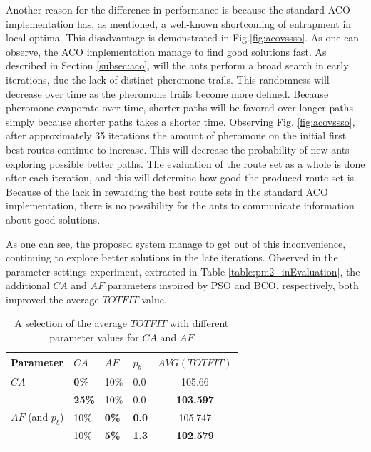 Another reason for the difference in performance is because the standard ACO implementation has, as mentioned, a well-known shortcoming of entrapment in local optima. This disadvantage is demonstrated in Fig.\ref{fig:acovssso}. As one can observe, the ACO implementation manage to find good solutions fast. As described in Section \vref{subsec:aco}, will the ants perform a broad search in early iterations, due the lack of distinct pheromone trails. This randomness will decrease over time as the pheromone trails become more defined. Because pheromone evaporate over time, shorter paths will be favored over longer paths simply because shorter paths takes a shorter time. Observing Fig. \ref{fig:acovssso}, after approximately 35 iterations the amount of pheromone on the initial first best routes continue to increase. This will decrease the probability of new ants exploring possible better paths. The evaluation of the route set as a whole is done after each iteration, and this will determine how good the produced route set is. Because of the lack in rewarding the best route sets in the standard ACO implementation, there is no possibility for the ants to communicate information about good solutions.

As one can see, the proposed system manage to get out of this inconvenience, continuing to explore better solutions in the late iterations. Observed in the parameter settings experiment, extracted in Table \vref{table:pm2_inEvaluation}, the additional $CA$ and $AF$ parameters inspired by PSO and BCO, respectively, both improved the average $TOTFIT$ value. 

\begin{table}
    \centering
    \begin{tabular}{|l|l|l|l|c|}
    \hline
    Parameter & $CA$ & $AF$ & $p_b$ & $AVG(TOTFIT)$ \\
    \hline
    $CA$ & \textbf{0\%} & 10\% & 0.0 & 105.66\\
    ~ & \textbf{25\%} & 10\% & 0.0 & \textbf{103.597}\\
    \hline
    $AF$ (and $p_b$) & 10\% & \textbf{0\%} & \textbf{0.0} & 105.747 \\
    ~ & 10\% & \textbf{5\%} & \textbf{1.3} & \textbf{102.579}\\
    \hline
    \end{tabular}
    \caption {A selection of the average $TOTFIT$ with different parameter values for $CA$ and $AF$}
    \label{table:pm2_inEvaluation}
\end{table}

